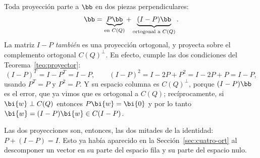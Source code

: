\begin{observacion}\label{obs:I-P}
Toda proyección parte a $\bb$ en dos piezas perpendiculares:
\[
\bb=\underbrace{P\bb}_{\text{en } C(Q)}
+\underbrace{(I-P)\bb}_{\text{ortogonal a } C(Q)} .
\]
La matriz $I-P$ \emph{también} es una proyección ortogonal, y proyecta sobre
el complemento ortogonal $C(Q)^{\perp}$. En efecto, cumple las dos
condiciones del Teorema~\ref{teo:proyector}:
\[
(I-P)^T=I-P^T=I-P ,
\qquad
(I-P)^2=I-2P+P^2=I-2P+P=I-P ,
\]
usando $P^T=P$ y $P^2=P$. Y su espacio columna es $C(Q)^{\perp}$, porque
$(I-P)\bb$ es el error, que ya vimos que es ortogonal a $C(Q)$; recíprocamente,
si $\bi{w}\perp C(Q)$ entonces $P\bi{w}=\bi{0}$ y por lo tanto
$\bi{w}=(I-P)\bi{w}\in C(I-P)$.

Las dos proyecciones son, entonces, las dos mitades de la identidad:
$P+(I-P)=I$. Esto ya había aparecido en la Sección~\ref{sec:cuatro-ort} al
descomponer un vector en su parte del espacio fila y su parte del espacio
nulo.
\end{observacion}

